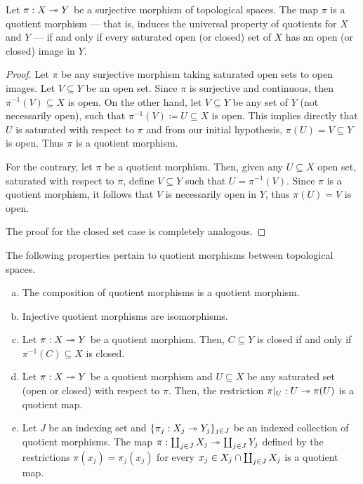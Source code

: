 \begin{proposition}
\label{prop:surjective-saturated-is-quotient}
Let \(\pi: X \twoheadrightarrow Y\) be a surjective morphism of topological spaces. The map
\(\pi\) is a quotient morphism --- that is, induces the universal property of
quotients for \(X\) and \(Y\) --- if and only if every saturated open (or
closed) set of \(X\) has an open (or closed) image in \(Y\).
\end{proposition}

\begin{proof}
Let \(\pi\) be any surjective morphism taking saturated open sets to open
images. Let \(V \subseteq Y\) be an open set. Since \(\pi\) is surjective and
continuous, then \(\pi^{-1}(V) \subseteq X\) is open. On the other hand, let \(V
\subseteq Y\) be any set of \(Y\) (not necessarily open), such that
\(\pi^{-1}(V) \coloneq U \subseteq X\) is open. This implies directly that \(U\)
is saturated with respect to \(\pi\) and from our initial hypothesis, \(\pi(U) =
V \subseteq Y\) is open. Thus \(\pi\) is a quotient morphism.

For the contrary, let \(\pi\) be a quotient morphism. Then, given any \(U
\subseteq X\) open set, saturated with respect to \(\pi\), define \(V \subseteq
Y\) such that \(U = \pi^{-1}(V)\). Since \(\pi\) is a quotient morphism, it
follows that \(V\) is necessarily open in \(Y\), thus \(\pi(U) = V\) is open.

The proof for the closed set case is completely analogous.
\end{proof}

\begin{proposition}
\label{prop:properties-quotient-morphism}
The following properties pertain to quotient morphisms between topological
spaces.
\begin{enumerate}[(a)]\setlength\itemsep{0em}
\item The composition of quotient morphisms is a quotient morphism.
\item Injective quotient morphisms are isomorphisms.
\item Let \(\pi: X \twoheadrightarrow Y\) be a quotient morphism. Then, \(C \subseteq Y\) is
  closed if and only if \(\pi^{-1}(C) \subseteq X\) is closed.
\item Let \(\pi: X \twoheadrightarrow Y\) be a quotient morphism and \(U \subseteq X\) be any
  saturated set (open or closed) with respect to \(\pi\). Then, the restriction
  \(\pi|_U: U \twoheadrightarrow \pi(U)\) is a quotient map.
\item Let \(J\) be an indexing set and \(\{\pi_j: X_j \twoheadrightarrow Y_j\}_{j \in J}\) be
  an indexed collection of quotient morphisms. The map \(\pi: \coprod_{j \in J}
  X_j \twoheadrightarrow \coprod_{j \in J} Y_j\) defined by the restrictions \(\pi(x_{j}) =
  \pi_{j}(x_j)\) for every \(x_j \in X_{j} \cap \coprod_{j \in J} X_j\) is a
  quotient map.
\end{enumerate}
\end{proposition}

